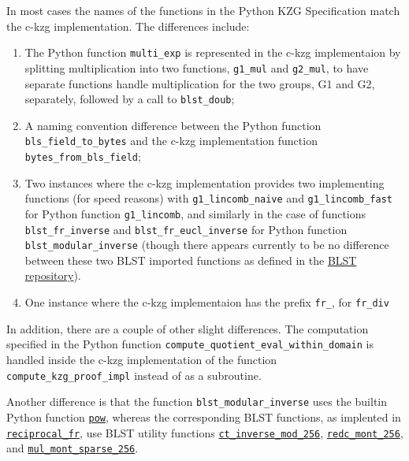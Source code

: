 \documentclass[12pt]{galois-whitepaper}
\begin{document}
In most cases the names of the functions in the Python KZG Specification match the c-kzg implementation. 
The differences include:
\begin{enumerate}
    \item The Python function \texttt{multi\_exp} is represented in the c-kzg implementaion 
by splitting multiplication into two functions, \texttt{g1\_mul} and \texttt{g2\_mul}, to have separate functions 
handle multiplication for the two groups, G1 and G2, separately, followed by a call to \texttt{blst\_doub};
    \item A naming convention difference between the Python function \texttt{bls\_field\_to\_bytes} and the c-kzg 
implementation function \texttt{bytes\_from\_bls\_field};
    \item Two instances where the c-kzg implementation provides two implementing functions (for speed reasons) with 
\texttt{g1\_lincomb\_naive} and \texttt{g1\_lincomb\_fast} for Python function \texttt{g1\_lincomb}, and 
similarly in the case of functions \texttt{blst\_fr\_inverse} and \texttt{blst\_fr\_eucl\_inverse} for Python function 
\texttt{blst\_modular\_inverse} (though there appears currently to be no difference between these two BLST imported 
functions as defined in the 
\href{https://github.com/supranational/blst/blob/415d4f0e2347a794091836a3065206edfd9c72f3/src/recip.c#L135}{BLST repository}). 
    \item One instance where the c-kzg implementaion has the prefix \texttt{fr\_}, for \texttt{fr\_div}
\end{enumerate}

In addition, there are a couple of other slight differences. The computation specified in the Python function 
\texttt{compute\_quotient\_eval\_within\_domain} is handled inside the c-kzg implementation of the 
function \texttt{compute\_kzg\_proof\_impl} instead of as a subroutine.

Another difference is that the function \texttt{blst\_modular\_inverse} uses the builtin Python function 
\href{https://docs.python.org/3/library/functions.html#pow}{\texttt{pow}}, whereas the corresponding BLST functions, as implented in 
\href{https://github.com/supranational/blst/blob/415d4f0e2347a794091836a3065206edfd9c72f3/src/recip.c#L122}{\texttt{reciprocal\_fr}}, 
use BLST utility functions \href{https://github.com/supranational/blst/blob/master/src/vect.h#L142}{\texttt{ct\_inverse\_mod\_256}}, 
\href{https://github.com/supranational/blst/blob/415d4f0e2347a794091836a3065206edfd9c72f3/src/recip.c#L131}{\texttt{redc\_mont\_256}}, and 
\href{https://github.com/supranational/blst/blob/415d4f0e2347a794091836a3065206edfd9c72f3/src/recip.c#L132}{\texttt{mul\_mont\_sparse\_256}}.
\end{document}
